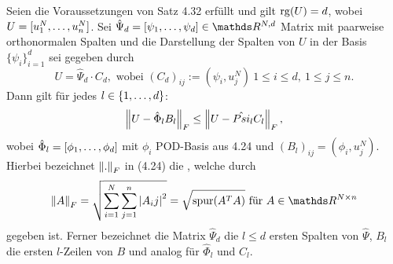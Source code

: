 Seien die Voraussetzungen von Satz 4.32 erfüllt und gilt $\operatorname{rg}(U)=d$, wobei $U=[u_1^N, \dots ,u_n^N]$.
Sei $\hat{\Psi}_d=[\psi_1\dt{,}\psi_d]\in \R^{N,d}$ Matrix mit paarweise orthonormalen Spalten und die Darstellung der Spalten von $U$ in der Basis $\{\psi_i\}_{i=1}^d$ sei gegeben durch
\[
U=\hat{\Psi}_d\cdot C_d,\text{ wobei } (C_d)_{ij} := (\psi_i,u_j^N)~1\le i\le d,~1\le j\le n.
\]
Dann gilt für jedes $l\in \{1, \dots ,d\}$:
\begin{align}
\left\Vert U-\hat{\Phi}_lB_l\right\Vert_F \le \left\Vert U-\hat{Psi}_lC_l\right\Vert_F,
\end{align}
wobei $\hat{\Phi}_l =[\phi_1, \dots ,\phi_d]$ mit $\phi_i$ POD-Basis aus 4.24 und $(B_l)_{ij}=(\phi_i,u_j^N)$.
Hierbei bezeichnet $\left\Vert.\right\Vert_F$ in (4.24) die , welche durch
\[
\norm{A}_F = \sqrt{\sum_{i=1}^{N}\sum_{j=1}^{n}\abs{A_ij}^2}= \sqrt{\spur(A^TA)} \text{ für } A\in \R^{N\times n}
\]
gegeben ist.
Ferner bezeichnet die Matrix $\hat{\Psi}_d$ die $l\le d$ ersten Spalten von $\hat{\Psi}$, $B_l$ die ersten $l$-Zeilen von $B$ und analog für $\hat{\Phi}_l$ und $C_l$.\\

